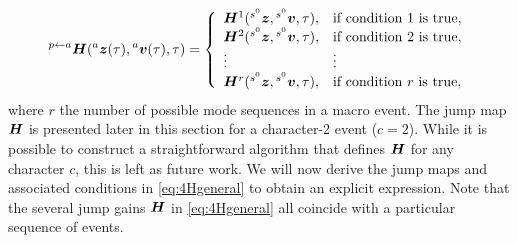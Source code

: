 \documentclass[../DC2017114Bouma.tex]{subfiles}
\begin{document}
\begin{align}
\hspace{0cm}^{p \leftarrow a}{\boldsymbol{H}}(\hspace{0cm}^{a}{\boldsymbol{z}}(\tau),\hspace{0cm}^{a}{\boldsymbol{v}}(\tau),\tau) = \left\lbrace\begin{array}{ll}
{\boldsymbol{H}}^1(\hspace{0cm}^{s^0}{\boldsymbol{z}},\hspace{0cm}^{s^0}{\boldsymbol{v}},\tau), & \text{if condition 1 is true},\\
{\boldsymbol{H}}^2(\hspace{0cm}^{s^0}{\boldsymbol{z}},\hspace{0cm}^{s^0}{\boldsymbol{v}},\tau), & \text{if condition 2 is true},\\
\vdots & \vdots\\
{\boldsymbol{H}}^{r}(\hspace{0cm}^{s^0}{\boldsymbol{z}},\hspace{0cm}^{s^0}{\boldsymbol{v}},\tau), & \text{if condition }r\text{ is true},
\end{array}\right.\label{eq:4Hgeneral}
\end{align}
where $r$ the number of possible mode sequences in a macro event. The jump map ${\boldsymbol{H}}$ is presented later in this section for a character-2 event ($c=2$). While it is possible to construct a straightforward algorithm that defines ${\boldsymbol{H}}$ for any character $c$, this is left as future work. We will now derive the jump maps and associated conditions in \eqref{eq:4Hgeneral} to obtain an explicit expression. Note that the several jump gains ${\boldsymbol{H}}$ in \eqref{eq:4Hgeneral} all coincide with a particular sequence of events.
\end{document}
